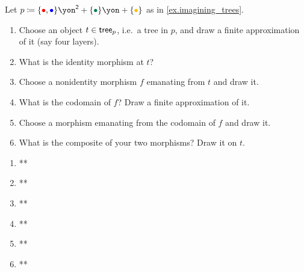 \documentclass[Book-Poly]{subfiles}
\begin{document}
\begin{exercise}
Let $p\coloneqq\{\bul[red],\bul[blue]\}\yon^\2+\{\bul[dgreen]\}\yon+\{\bul[dyellow]\}$ as in \cref{ex.imagining_trees}.
\begin{enumerate}
	\item Choose an object $t\in \mathsf{tree}_p$, i.e.\ a tree in $p$, and draw a finite approximation of it (say four layers).
	\item What is the identity morphism at $t$?
	\item Choose a nonidentity morphism $f$ emanating from $t$ and draw it.
	\item What is the codomain of $f$? Draw a finite approximation of it.
	\item Choose a morphism emanating from the codomain of $f$ and draw it.
	\item What is the composite of your two morphisms? Draw it on $t$.
\qedhere
\end{enumerate}
\begin{solution}
\begin{enumerate}
    \item **
    \item **
    \item **
    \item **
    \item **
    \item **
\end{enumerate}
\end{solution}
\end{exercise}
\end{document}
